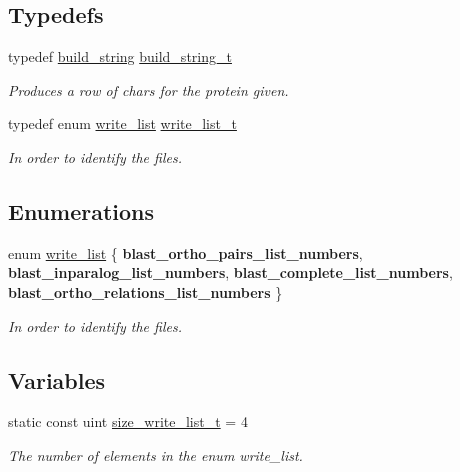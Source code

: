 \subsection*{Typedefs}
\begin{DoxyCompactItemize}
\item 
typedef \hyperlink{classbuild__string}{build\_\-string} \hyperlink{group__filter__container_gac5f932c8e1e900105f8154bf8d07d599}{build\_\-string\_\-t}
\begin{DoxyCompactList}\small\item\em Produces a row of chars for the protein given. \end{DoxyCompactList}\item 
typedef enum \hyperlink{group__filter__container_ga325afe5f8676598d13bfaab40f8ce64e}{write\_\-list} \hyperlink{group__filter__container_ga2e624181c20dfdcd672e236540620248}{write\_\-list\_\-t}
\begin{DoxyCompactList}\small\item\em In order to identify the files. \end{DoxyCompactList}\end{DoxyCompactItemize}
\subsection*{Enumerations}
\begin{DoxyCompactItemize}
\item 
enum \hyperlink{group__filter__container_ga325afe5f8676598d13bfaab40f8ce64e}{write\_\-list} \{ {\bfseries blast\_\-ortho\_\-pairs\_\-list\_\-numbers}, 
{\bfseries blast\_\-inparalog\_\-list\_\-numbers}, 
{\bfseries blast\_\-complete\_\-list\_\-numbers}, 
{\bfseries blast\_\-ortho\_\-relations\_\-list\_\-numbers}
 \}
\begin{DoxyCompactList}\small\item\em In order to identify the files. \end{DoxyCompactList}\end{DoxyCompactItemize}
\subsection*{Variables}
\begin{DoxyCompactItemize}
\item 
static const uint \hyperlink{group__filter__container_ga6b6d23698901cace6cbeaa20b999d9c0}{size\_\-write\_\-list\_\-t} = 4
\begin{DoxyCompactList}\small\item\em The number of elements in the enum write\_\-list. \end{DoxyCompactList}\end{DoxyCompactItemize}


